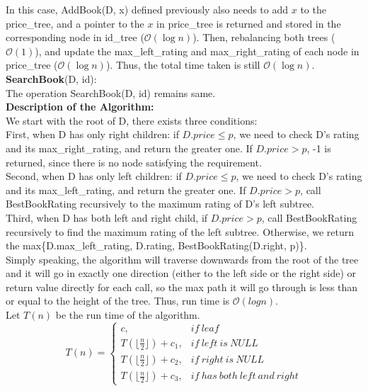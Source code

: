 \documentclass[10pt]{article}
\begin{document}
\begin{enumerate}
In this case, AddBook(D, x) defined previously also needs to add $x$ to the price\_tree, and a pointer to the $x$ in price\_tree is returned and stored in the corresponding node in id\_tree ($\mathcal{O}(\log{}n)$). Then, rebalancing both trees ($\mathcal{O}(1)$), and update the max\_left\_rating and max\_right\_rating of each node in price\_tree ($\mathcal{O}(\log{}n)$). Thus, the total time taken is still $\mathcal{O}(\log{}n)$.\\
\textbf{SearchBook}(D, id):\\
The operation SearchBook(D, id) remains same.\\
\textbf{Description of the Algorithm:}\\
We start with the root of D, there exists three conditions:\\
First, when D has only right children: if $D.price \leq p$, we need to check  D's rating and its max\_right\_rating, and return the greater one. If $D.price > p$, -1 is returned, since there is no node satisfying the requirement.\\
Second, when D has only left children: if $D.price \leq p$, we need to check  D's rating and its max\_left\_rating, and return the greater one. If $D.price > p$, call BestBookRating recursively to the maximum rating of D's left subtree.\\
Third, when D has both left and right child, if $D.price > p$, call BestBookRating recursively to find the maximum rating of the left subtree. Otherwise, we return the max\{D.max\_left\_rating, D.rating, BestBookRating(D.right, p)\}.\\
Simply speaking, the algorithm will traverse downwards from the root of the tree and it will go in exactly one direction (either to the left side or the right side) or return value directly for each call, so the max path it will go through is less than or equal to the height of the tree. Thus, run time is $\mathcal{O}(logn)$.\\
Let $T(n)$ be the run time of the algorithm.
\begin{equation*}
  T(n)=\begin{cases}
    c, &if\ leaf\\
    T( \lfloor\frac{n}{2}\rfloor) + c_1, &if\ left\ is\ NULL\\
    T(\lfloor\frac{n}{2}\rfloor) + c_2, &if\ right\ is\ NULL\\
    T(\lfloor\frac{n}{2}\rfloor) + c_3, &if\ has\ both\ left\ and\ right
  \end{cases}
\end{equation*}


\end{enumerate}
\end{document}
